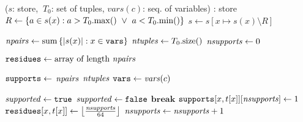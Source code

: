      \PROCEDURE \InitialiseCT($s$: store, %
      $\ T_0$: set of tuples, $\mathit{vars}(c)$: seq. of variables) : store
       \label{line:init:-1} %
          \STATE $R \leftarrow \left\{a \in s(x) : a > T_0.\mathrm{max}()
                 \ \lor \ a < T_0.\mathrm{min}()\right\}$
           \STATE $s \leftarrow s[x \mapsto s(x) \setminus R]$
               \RETURN{$\emptyset$} \label{line:init:wipeout0}
          \ENDIF

       \ENDFOREACH \label{line:init:0}

      \STATE $\mathit{npairs} \leftarrow \mathrm{sum}\left\{|s(x)| : x \in \texttt{vars}\right\}$
      \label{line:init:3}
      \STATE $\mathit{ntuples} \leftarrow T_0.\mathrm{size}()$ 
      \STATE $\mathit{nsupports} \leftarrow 0$  \label{line:init:4}

      \STATE $\texttt{residues} \leftarrow \text{array of length~} \mathit{npairs}$ \label{line:init:residue}

      \STATE $\texttt{supports} \leftarrow$ $\mathit{npairs}$ $\mathit{ntuples}$ \label{line:init:supports}
      \STATE $\texttt{vars} \gets \mathit{vars}(c)$ \label{line:init:vars}


       \label{line:init:6}
        \STATE $\mathit{supported} \leftarrow \texttt{true}$
            \STATE $\mathit{supported} \leftarrow \texttt{false}$
            \STATE $\textbf{break}$ 
          \ENDIF
        \ENDFOREACH
             \label{line:init:9}
              \STATE $\texttt{supports}[x,t[x]][\mathit{nsupports}] \leftarrow 1$ \label{line:init:10}
              \STATE $\texttt{residues}[x,t[x]] \leftarrow \left\lfloor\frac{\mathit{nsupports}}{64}\right\rfloor$
              \label{line:init:11}
              \STATE $\mathit{nsupports} \leftarrow \mathit{nsupports} + 1$ \label{line:init:12}
            \ENDFOREACH
          \ENDIF
      \ENDFOREACH \label{line:init:7}

